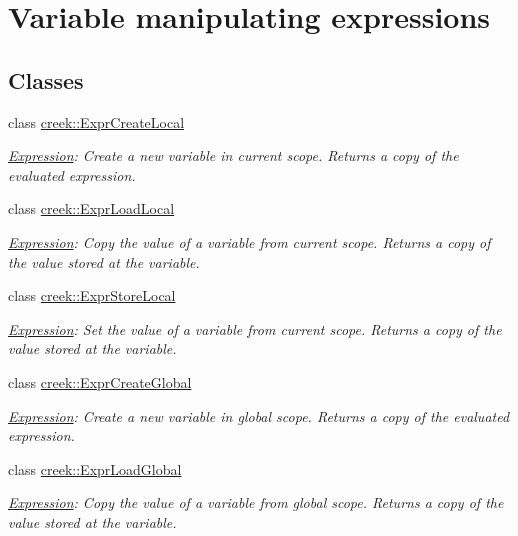 \hypertarget{group__expression__variable}{}\section{Variable manipulating expressions}
\label{group__expression__variable}
\subsection*{Classes}
\begin{DoxyCompactItemize}
\item 
class \hyperlink{classcreek_1_1_expr_create_local}{creek\+::\+Expr\+Create\+Local}
\begin{DoxyCompactList}\small\item\em \hyperlink{classcreek_1_1_expression}{Expression}\+: Create a new variable in current scope. Returns a copy of the evaluated expression. \end{DoxyCompactList}\item 
class \hyperlink{classcreek_1_1_expr_load_local}{creek\+::\+Expr\+Load\+Local}
\begin{DoxyCompactList}\small\item\em \hyperlink{classcreek_1_1_expression}{Expression}\+: Copy the value of a variable from current scope. Returns a copy of the value stored at the variable. \end{DoxyCompactList}\item 
class \hyperlink{classcreek_1_1_expr_store_local}{creek\+::\+Expr\+Store\+Local}
\begin{DoxyCompactList}\small\item\em \hyperlink{classcreek_1_1_expression}{Expression}\+: Set the value of a variable from current scope. Returns a copy of the value stored at the variable. \end{DoxyCompactList}\item 
class \hyperlink{classcreek_1_1_expr_create_global}{creek\+::\+Expr\+Create\+Global}
\begin{DoxyCompactList}\small\item\em \hyperlink{classcreek_1_1_expression}{Expression}\+: Create a new variable in global scope. Returns a copy of the evaluated expression. \end{DoxyCompactList}\item 
class \hyperlink{classcreek_1_1_expr_load_global}{creek\+::\+Expr\+Load\+Global}
\begin{DoxyCompactList}\small\item\em \hyperlink{classcreek_1_1_expression}{Expression}\+: Copy the value of a variable from global scope. Returns a copy of the value stored at the variable. \end{DoxyCompactList}\item 

\end{DoxyCompactItemize}

